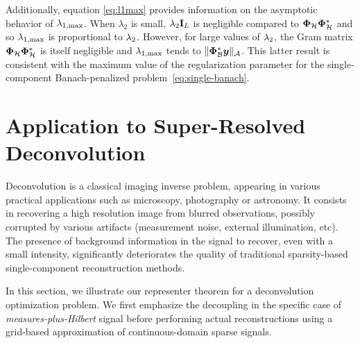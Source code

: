 \documentclass[12pt]{article}
\begin{document}

    Additionally, equation \eqref{eq:l1max} provides information on the asymptotic behavior of $\lambda_{1, \mathrm{max}}$. When $\lambda_2$ is small, $\lambda_{2} \mathbf{I}_L$ is negligible compared to $\bm{\Phi}_\mathcal{H} \bm{\Phi}_\mathcal{H}^*$ and so $\lambda_{1, \mathrm{max}}$ is proportional to $\lambda_{2}$. However, for large values of $\lambda_{2}$, the Gram matrix $\bm{\Phi}_\mathcal{H} \bm{\Phi}_\mathcal{H}^*$ is itself negligible and $\lambda_{1, \mathrm{max}}$ tends to $\lVert \bm{\Phi}_\mathcal{B}^* \bm{y}\rVert_{\mathcal{A}}$. This latter result is consistent with the maximum value of the regularization parameter for the single-component Banach-penalized problem~\eqref{eq:single-banach}.



\section{Application to Super-Resolved Deconvolution}
\label{sec:application}

    Deconvolution is a classical imaging inverse problem, appearing in various practical applications such as microscopy, photography or astronomy. It consists in recovering a high resolution image from blurred observations, possibly corrupted by various artifacts (measurement noise, external illumination, etc).
    The presence of background information in the signal to recover, even with a small intensity, significantly deteriorates the quality of traditional sparsity-based single-component reconstruction methods.

    In this section, we illustrate our representer theorem for a deconvolution optimization problem. We first emphasize the decoupling in the specific case of \emph{measures-plus-Hilbert} signal before performing actual reconstructions using a grid-based approximation of continuous-domain sparse signals.

\end{document}

